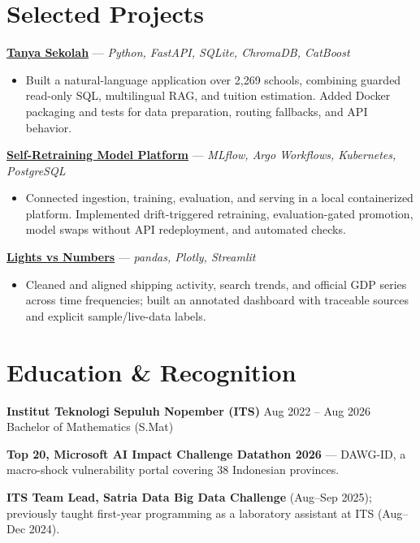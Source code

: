 \documentclass[11pt,a4paper]{article}
\begin{document}
\section{Selected Projects}
\textbf{\href{https://github.com/AKARandy/tanya-sekolah}{Tanya Sekolah}} --- \textit{Python, FastAPI, SQLite, ChromaDB, CatBoost}\par
\begin{itemize}
\item Built a natural-language application over 2,269 schools, combining guarded read-only SQL, multilingual RAG, and tuition estimation. Added Docker packaging and tests for data preparation, routing fallbacks, and API behavior.
\end{itemize}
\textbf{\href{https://github.com/AKARandy/Self-Retraining-Model-Platform}{Self-Retraining Model Platform}} --- \textit{MLflow, Argo Workflows, Kubernetes, PostgreSQL}\par
\begin{itemize}
\item Connected ingestion, training, evaluation, and serving in a local containerized platform. Implemented drift-triggered retraining, evaluation-gated promotion, model swaps without API redeployment, and automated checks.
\end{itemize}
\textbf{\href{https://github.com/AKARandy/Lights-vs-Numbers}{Lights vs Numbers}} --- \textit{pandas, Plotly, Streamlit}\par
\begin{itemize}
\item Cleaned and aligned shipping activity, search trends, and official GDP series across time frequencies; built an annotated dashboard with traceable sources and explicit sample/live-data labels.
\end{itemize}
\section{Education \& Recognition}
\textbf{Institut Teknologi Sepuluh Nopember (ITS)} \hfill Aug 2022 -- Aug 2026\\
Bachelor of Mathematics (S.Mat)\par\vspace{4pt}
\textbf{Top 20, Microsoft AI Impact Challenge Datathon 2026} --- DAWG-ID, a macro-shock vulnerability portal covering 38 Indonesian provinces.\par\vspace{4pt}
\textbf{ITS Team Lead, Satria Data Big Data Challenge} (Aug--Sep 2025); previously taught first-year programming as a laboratory assistant at ITS (Aug--Dec 2024).
\end{document}
